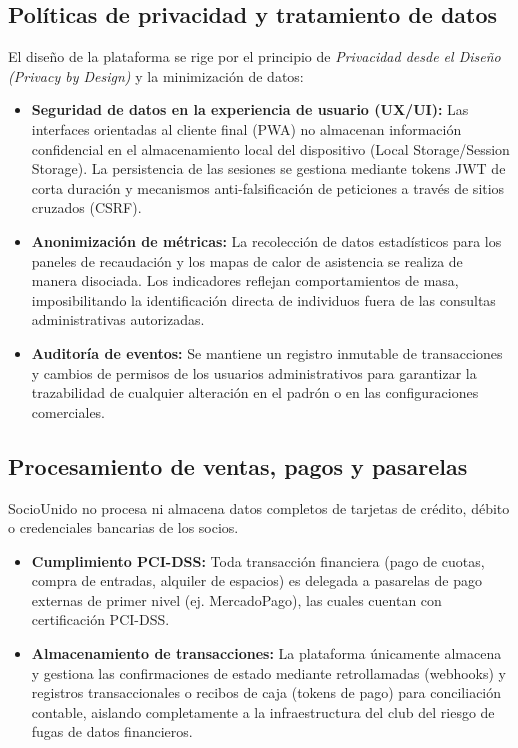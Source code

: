 \subsection{Políticas de privacidad y tratamiento de datos}
El diseño de la plataforma se rige por el principio de \textit{Privacidad desde el Diseño (Privacy by Design)} y la minimización de datos:

\begin{itemize}
    \item \textbf{Seguridad de datos en la experiencia de usuario (UX/UI):} Las interfaces orientadas al cliente final (PWA) no almacenan información confidencial en el almacenamiento local del dispositivo (Local Storage/Session Storage). La persistencia de las sesiones se gestiona mediante tokens JWT de corta duración y mecanismos anti-falsificación de peticiones a través de sitios cruzados (CSRF).
    \item \textbf{Anonimización de métricas:} La recolección de datos estadísticos para los paneles de recaudación y los mapas de calor de asistencia se realiza de manera disociada. Los indicadores reflejan comportamientos de masa, imposibilitando la identificación directa de individuos fuera de las consultas administrativas autorizadas.
    \item \textbf{Auditoría de eventos:} Se mantiene un registro inmutable de transacciones y cambios de permisos de los usuarios administrativos para garantizar la trazabilidad de cualquier alteración en el padrón o en las configuraciones comerciales.
\end{itemize}

\subsection{Procesamiento de ventas, pagos y pasarelas}
SocioUnido no procesa ni almacena datos completos de tarjetas de crédito, débito o credenciales bancarias de los socios.

\begin{itemize}
    \item \textbf{Cumplimiento PCI-DSS:} Toda transacción financiera (pago de cuotas, compra de entradas, alquiler de espacios) es delegada a pasarelas de pago externas de primer nivel (ej. MercadoPago), las cuales cuentan con certificación PCI-DSS. 
    \item \textbf{Almacenamiento de transacciones:} La plataforma únicamente almacena y gestiona las confirmaciones de estado mediante retrollamadas (webhooks) y registros transaccionales o recibos de caja (tokens de pago) para conciliación contable, aislando completamente a la infraestructura del club del riesgo de fugas de datos financieros.
\end{itemize}

